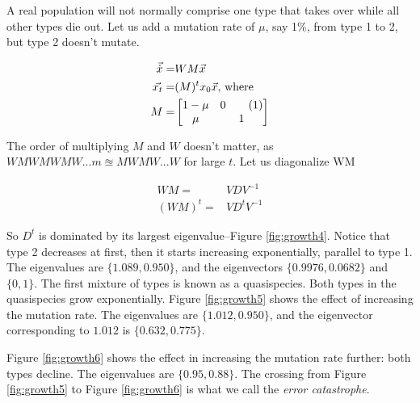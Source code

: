 \documentclass[]{article}
\newcommand\numberthis{\addtocounter{equation}{1}\tag{\theequation}}
\begin{document}
A real population will not normally comprise one type that takes over while all other types die out. Let us add a mutation rate of $\mu$, say 1\%, from type 1 to 2, but type 2 doesn't mutate.


\begin{align*}
	\vec{\dot{x}} =& W M \vec{x} \\
	\vec{x_t}=& ( M )^t x_0  \vec{x}\text{, where}\\
	M =& \begin{bmatrix}
	1-\mu & 0 \numberthis \label{eq:M}\\
	\mu& 1
	\end{bmatrix}
\end{align*}

The order of multiplying $M$ and $W$ doesn't matter, as $WMWMWMW...m\approxeq MWMW...W$ for large $t$. 	Let us diagonalize WM

\begin{align*}
	WM =& VDV^{-1}\\
	(WM)^t =& V D^t V^{-1}
\end{align*}

So $D^t$ is dominated by its largest eigenvalue--Figure \ref{fig:growth4}. Notice that type 2 decreases at first, then it starts increasing exponentially, parallel to type 1. The eigenvalues are $\{1.089, 0.950\}$, and the eigenvectors $\{0.9976,0.0682\}$ and $\{0,1\}$. The first mixture of types is known as a quasispecies. Both types in the quasispecies grow exponentially. Figure \ref{fig:growth5} shows the effect of increasing the mutation rate. The eigenvalues are $\{1.012, 0.950\}$, and the eigenvector corresponding to $1.012$ is $\{0.632,0.775\}$. 

Figure \ref{fig:growth6} shows the effect in increasing the mutation rate further: both types decline. The eigenvalues are $\{0.95, 0.88\}$. The crossing from Figure \ref{fig:growth5} to Figure \ref{fig:growth6} is what we call the \emph{error catastrophe}.
\end{document}
